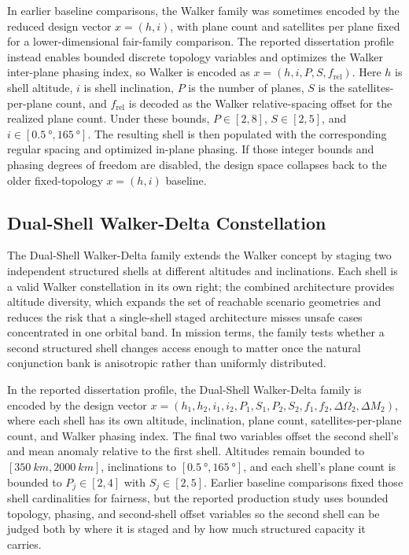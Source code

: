         In earlier baseline comparisons, the Walker family was sometimes encoded by the reduced design vector \(x=(h,i)\), with plane count and satellites per plane fixed for a lower-dimensional fair-family comparison. The reported dissertation profile instead enables bounded discrete topology variables and optimizes the Walker inter-plane phasing index, so Walker is encoded as \(x=(h,i,P,S,f_{\mathrm{rel}})\). Here \(h\) is shell altitude, \(i\) is shell inclination, \(P\) is the number of planes, \(S\) is the satellites-per-plane count, and \(f_{\mathrm{rel}}\) is decoded as the Walker relative-spacing offset for the realized plane count. Under these bounds, \(P\in[2,8]\), \(S\in[2,5]\), and \(i\in[\SI{0.5}{\degree},\SI{165}{\degree}]\). The resulting shell is then populated with the corresponding regular  spacing and optimized in-plane phasing. If those integer bounds and phasing degrees of freedom are disabled, the design space collapses back to the older fixed-topology \(x=(h,i)\) baseline.

        \subsection{Dual-Shell Walker-Delta Constellation} \label{ss:dual}
        The Dual-Shell Walker-Delta family extends the Walker concept by staging two independent structured shells at different altitudes and inclinations. Each shell is a valid Walker constellation in its own right; the combined architecture provides altitude diversity, which expands the set of reachable scenario geometries and reduces the risk that a single-shell staged architecture misses unsafe cases concentrated in one orbital band. In mission terms, the family tests whether a second structured shell changes access enough to matter once the natural conjunction bank is anisotropic rather than uniformly distributed.

        In the reported dissertation profile, the Dual-Shell Walker-Delta family is encoded by the design vector \(x = (h_1,h_2,i_1,i_2,P_1,S_1,P_2,S_2,f_1,f_2,\Delta\Omega_2,\Delta M_2)\), where each shell has its own altitude, inclination, plane count, satellites-per-plane count, and Walker phasing index. The final two variables offset the second shell's  and mean anomaly relative to the first shell. Altitudes remain bounded to \([\SI{350}{km},\SI{2000}{km}]\), inclinations to \([\SI{0.5}{\degree},\SI{165}{\degree}]\), and each shell's plane count is bounded to \(P_j\in[2,4]\) with \(S_j\in[2,5]\). Earlier baseline comparisons fixed those shell cardinalities for fairness, but the reported production study uses bounded topology, phasing, and second-shell offset variables so the second shell can be judged both by where it is staged and by how much structured capacity it carries.

